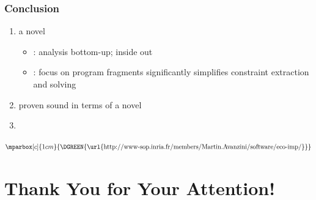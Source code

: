 \documentclass[
11pt,
usepdftitle=false,
aspectratio=169,
xcolor={table,usenames,dvipsnames},
]{beamer}
\begin{document}
  \begin{frame}
    \frametitle{Conclusion}

    \begin{enumerate}
    \item
      a novel 
      \smallskip
      \begin{itemize}
      \item {}: analysis bottom-up; inside out \smallskip
      \item {}: focus on program fragments significantly simplifies constraint extraction and solving
      \end{itemize}
      \bigskip
    \item
      proven sound in terms of a novel 
      \bigskip
    \item {}
    \end{enumerate}
  \begin{center}
      \small$\mparbox[c]{1cm}{\text{\DGREEN{\url{http://www-sop.inria.fr/members/Martin.Avanzini/software/eco-imp/}}}}$
    \end{center}
  \end{frame}

\section{Thank You for Your Attention!}

% 
% 
\end{document}
